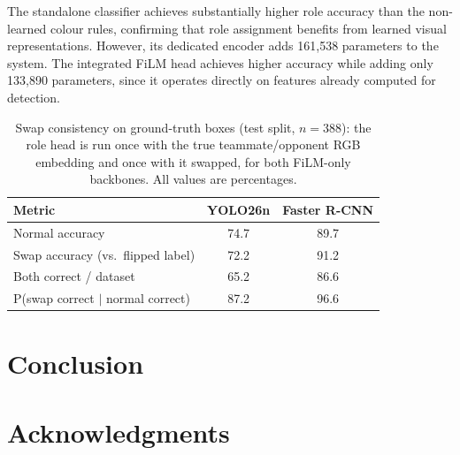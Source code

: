 \documentclass{article}
\begin{document}
The standalone classifier achieves substantially higher role accuracy than the non-learned colour rules, confirming that role assignment benefits from learned visual representations. However, its dedicated encoder adds 161,538 parameters to the system. The integrated FiLM head achieves higher accuracy while adding only 133,890 parameters, since it operates directly on features already computed for detection.

\begin{table}[h]
\centering
\begin{tabular}{l|c|c}
Metric & YOLO26n & Faster R-CNN \\
\hline
Normal accuracy & 74.7 & 89.7 \\
\hline
Swap accuracy (vs.\ flipped label) & 72.2 & 91.2 \\
\hline
Both correct / dataset & 65.2 & 86.6 \\
\hline
P(swap correct $\mid$ normal correct) & 87.2 & 96.6 \\
\end{tabular}
\caption{Swap consistency on ground-truth boxes (test split, $n=388$): the role head is run once with the true teammate/opponent RGB embedding and once with it swapped, for both FiLM-only backbones. All values are percentages.}
\label{tab:swap-consistency}
\end{table}



\section{Conclusion} 


\section*{Acknowledgments}




\end{document}
